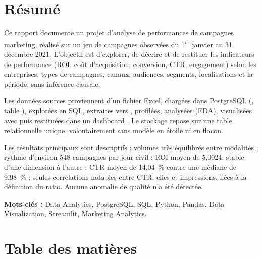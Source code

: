 \documentclass{internshipreport}
\begin{document}


\frontmatter

\chapter*{Résumé}

Ce rapport documente un projet d'analyse de performances de campagnes marketing, réalisé sur un jeu de  campagnes observées du 1\textsuperscript{er} janvier au 31 décembre 2021. L'objectif est d'explorer, de décrire et de restituer les indicateurs de performance (ROI, coût d'acquisition, conversion, CTR, engagement) selon les entreprises, types de campagnes, canaux, audiences, segments, localisations et la période, sans inférence causale.

Les données sources proviennent d'un fichier Excel, chargées dans PostgreSQL (, table ), explorées en SQL, extraites vers , profilées, analysées (EDA), visualisées avec  puis restituées dans un dashboard . Le stockage repose sur une table relationnelle unique, volontairement sans modèle en étoile ni en flocon.

Les résultats principaux sont descriptifs : volumes très équilibrés entre modalités ; rythme d'environ 548 campagnes par jour civil ; ROI moyen de 5,0024, stable d'une dimension à l'autre ; CTR moyen de 14,04~\% contre une médiane de 9,98~\% ; seules corrélations notables entre CTR, clics et impressions, liées à la définition du ratio. Aucune anomalie de qualité n'a été détectée.

\textbf{Mots-clés :} Data Analytics, PostgreSQL, SQL, Python, Pandas, Data Visualization, Streamlit, Marketing Analytics.

\newpage
\chapter*{Table des matières}
\vspace*{-2cm}
\begin{singlespace}
\renewcommand{\contentsname}{}
\vspace*{-1cm}
\tableofcontents
\end{singlespace}

\newpage
\end{document}
